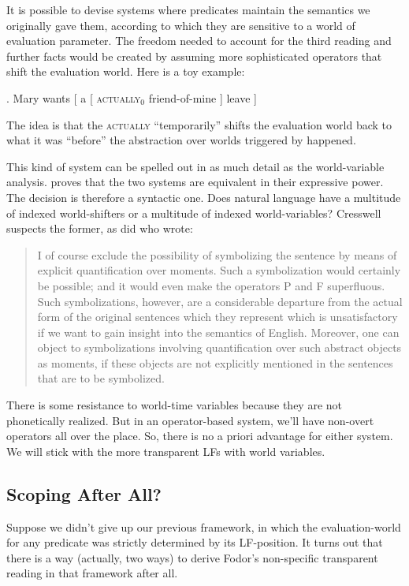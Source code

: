 It is possible to devise systems where predicates maintain the semantics we originally gave them, according to which they are sensitive to a world of evaluation parameter. The freedom needed to account for the third reading and further facts would be created by assuming more sophisticated operators that shift the evaluation world. Here is a toy example:

\ex. Mary wants [ a [ \textsc{actually}$_0$ friend-of-mine ] leave ]

The idea is that the \textsc{actually} ``temporarily'' shifts the evaluation world back to what it was ``before'' the abstraction over worlds triggered by  happened.

This kind of system can be spelled out in as much detail as the world-variable analysis. \citet{cresswell:entities} proves that the two systems are equivalent in their expressive power. The decision is therefore a syntactic one. Does natural language have a multitude of indexed world-shifters or a multitude of indexed world-variables? Cresswell suspects the former, as did \citet{kamp:now} who wrote:

\begin{quote}
  I of course exclude the possibility of symbolizing the sentence by means of explicit quantification over moments. Such a symbolization would certainly be possible; and it would even make the operators P and F superfluous. Such symbolizations, however, are a considerable departure from the actual form of the original sentences which they represent \dash which is unsatisfactory if we want to gain insight into the semantics of English. Moreover, one can object to symbolizations involving quantification over such abstract objects as moments, if these objects are not explicitly mentioned in the sentences that are to be symbolized. 
\end{quote}
%
There is some resistance to world-time variables because they are not phonetically realized. But in an operator-based system, we'll have non-overt operators all over the place. So, there is no a priori advantage for either system. We will stick with the more transparent LFs with world variables.

\subsection{Scoping After All?}

Suppose we didn't give up our previous framework, in which the evaluation-world for any predicate was strictly determined by its LF-position. It turns out that there is a way (actually, two ways) to derive Fodor's non-specific transparent reading in that framework after all.

